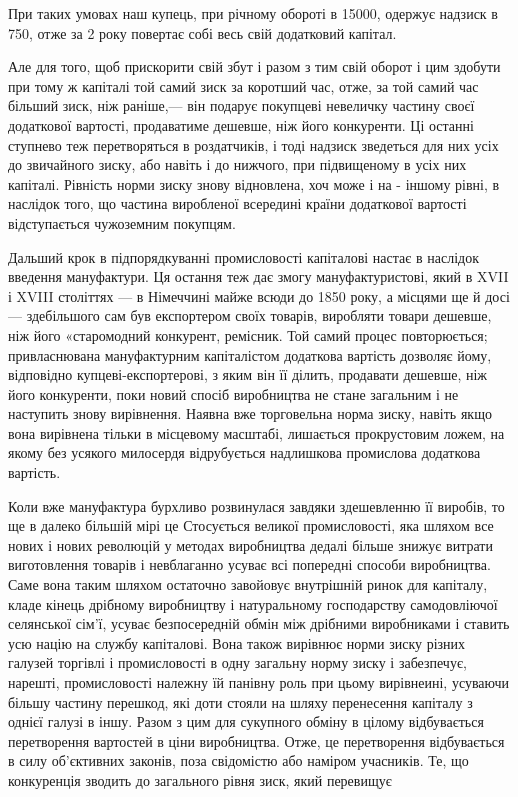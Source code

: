 \parcont{}  %
При таких умовах наш купець, при річному
обороті в 15000, одержує надзиск в 750, отже за 2 року повертає собі весь свій додатковий капітал.

Але для того, щоб
прискорити свій збут і разом з тим свій оборот і цим здобути при тому ж капіталі той самий зиск за коротший час, отже, за
той самий час більший зиск, ніж раніше,— він подарує покупцеві невеличку частину своєї додаткової вартості, продаватиме
дешевше, ніж його конкуренти.
Ці останні ступнево теж перетворяться в роздатчиків, і тоді надзиск зведеться для них усіх до звичайного зиску, або навіть і
до нижчого, при підвищеному в усіх них капіталі. Рівність норми зиску знову відновлена, хоч може і на - іншому рівні, в
наслідок того, що частина виробленої всередині країни додаткової вартості відступається чужоземним покупцям.

Дальший крок в
підпорядкуванні промисловості капіталові настає в наслідок введення мануфактури. Ця остання теж дає змогу мануфактуристові,
який в XVII і XVIII століттях — в Німеччині майже всюди до 1850 року, а місцями ще й досі — здебільшого сам був експортером
своїх товарів, виробляти товари дешевше, ніж його «старомодний конкурент, ремісник. Той самий процес повторюється;
привласнювана мануфактурним капіталістом додаткова вартість дозволяє йому, відповідно купцеві-експортерові, з яким він її
ділить, продавати дешевше, ніж його конкуренти, поки новий спосіб виробництва не стане загальним і не наступить знову
вирівнення. Наявна вже торговельна норма зиску, навіть якщо вона вирівнена тільки в місцевому масштабі, лишається
прокрустовим ложем, на якому без усякого милосердя відрубується надлишкова промислова додаткова вартість.

Коли вже мануфактура бурхливо розвинулася завдяки здешевленню її виробів, то ще в далеко більшій мірі це Стосується великої
промисловості, яка шляхом все нових і нових революцій у методах виробництва дедалі більше знижує витрати виготовлення
товарів і невблаганно усуває всі попередні способи виробництва. Саме вона таким шляхом остаточно завойовує внутрішній ринок
для капіталу, кладе кінець дрібному виробництву і натуральному господарству самодовліючої селянської сім’ї, усуває
безпосередній обмін між дрібними виробниками і ставить усю націю на службу капіталові. Вона також вирівнює норми зиску
різних галузей торгівлі і промисловості в одну загальну норму зиску і забезпечує, нарешті, промисловості належну їй панівну
роль при цьому вирівнеині, усуваючи більшу частину перешкод, які доти стояли на шляху перенесення капіталу з однієї галузі в
іншу. Разом з цим для сукупного обміну в цілому відбувається перетворення вартостей в ціни виробництва. Отже, це
перетворення відбувається в силу об’єктивних законів, поза свідомістю або наміром учасників. Те, що конкуренція зводить до
загального рівня зиск, який перевищує
\parbreak{}  %
